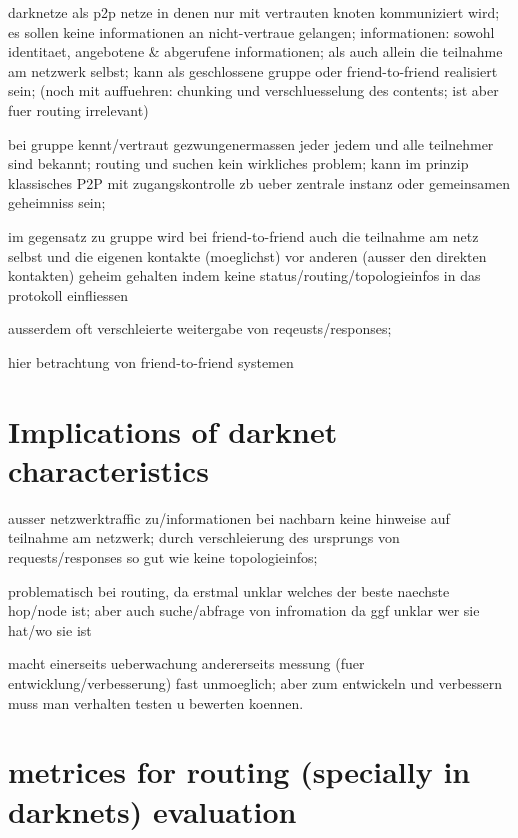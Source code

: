 
darknetze als p2p netze in denen nur mit vertrauten knoten kommuniziert wird; es sollen keine informationen an nicht-vertraue gelangen; informationen: sowohl identitaet, angebotene & abgerufene informationen; als auch allein die teilnahme am netzwerk selbst; kann als geschlossene gruppe oder friend-to-friend realisiert sein; (noch mit auffuehren: chunking und verschluesselung des contents; ist aber fuer routing irrelevant)

bei gruppe kennt/vertraut gezwungenermassen jeder jedem und alle teilnehmer sind bekannt; routing und suchen kein wirkliches problem; kann im prinzip klassisches P2P mit zugangskontrolle zb ueber zentrale instanz oder gemeinsamen geheimniss sein;

im gegensatz zu gruppe wird bei friend-to-friend auch die teilnahme am netz selbst und die eigenen kontakte (moeglichst) vor anderen (ausser den direkten kontakten) geheim gehalten indem keine status/routing/topologieinfos in das protokoll einfliessen

ausserdem oft verschleierte weitergabe von reqeusts/responses;

hier betrachtung von friend-to-friend systemen

\section{Implications of darknet characteristics}

ausser netzwerktraffic zu/informationen bei nachbarn keine hinweise auf teilnahme am netzwerk; durch verschleierung des ursprungs von requests/responses so gut wie keine topologieinfos;

problematisch bei routing, da erstmal unklar welches der beste naechste hop/node ist; aber auch suche/abfrage von infromation da ggf unklar wer sie hat/wo sie ist

macht einerseits ueberwachung andererseits messung (fuer entwicklung/verbesserung) fast unmoeglich; aber zum entwickeln und verbessern muss man verhalten testen u bewerten koennen.

\section{metrices for routing (specially in darknets) evaluation}

